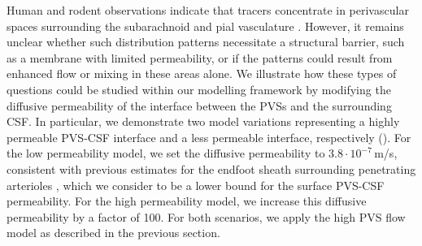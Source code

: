 \documentclass[fleqn,10pt]{wlscirep}
\begin{document}
Human and rodent observations indicate that tracers concentrate in
perivascular spaces surrounding the subarachnoid and pial vasculature
\cite{zhang1990interrelationships,zhang1992directional,
  bedussi2017paravascular, mestre2018flow, bedussi2018paravascular,
  eide2024functional}. However, it remains unclear whether such
distribution patterns necessitate a structural barrier, such as a
membrane with limited permeability, or if the patterns could result
from enhanced flow or mixing in these areas alone. We illustrate how
these types of questions could be studied within our modelling
framework by modifying the diffusive permeability of the interface
between the PVSs and the surrounding CSF. In particular, we
demonstrate two model variations representing a highly permeable
PVS-CSF interface and a less permeable interface, respectively
(). For the low permeability model, we
set the diffusive permeability to $3.8 \cdot 10^{-7}\,$m/s, consistent
with previous estimates for the endfoot sheath surrounding penetrating
arterioles \cite{koch2023estimates}, which we consider to be a lower
bound for the surface PVS-CSF permeability. For the high permeability
model, we increase this diffusive permeability by a factor of 100. For
both scenarios, we apply the high PVS flow model as described in the
previous section.
\end{document}
